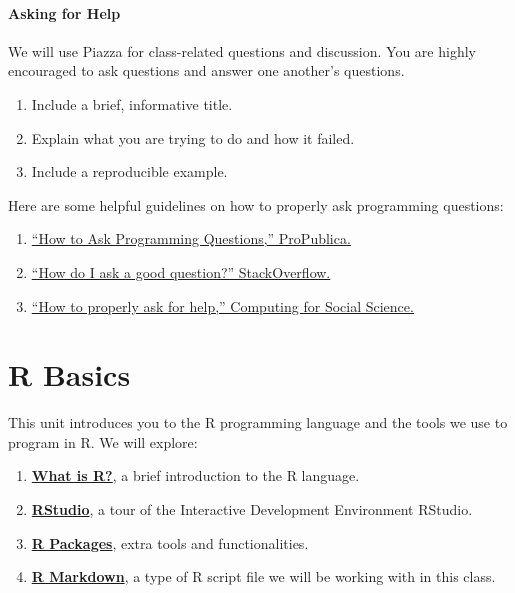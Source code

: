 \documentclass[]{book}
\providecommand{\tightlist}{%
  \setlength{\itemsep}{0pt}\setlength{\parskip}{0pt}}
\begin{document}
\subsubsection*{Asking for Help}\label{asking-for-help}

We will use Piazza for class-related questions and discussion. You are
highly encouraged to ask questions and answer one another's questions.

\begin{enumerate}
\def\labelenumi{\arabic{enumi}.}
\tightlist
\item
  Include a brief, informative title.
\item
  Explain what you are trying to do and how it failed.
\item
  Include a reproducible example.
\end{enumerate}

Here are some helpful guidelines on how to properly ask programming
questions:

\begin{enumerate}
\def\labelenumi{\arabic{enumi}.}
\tightlist
\item
  \href{https://www.propublica.org/nerds/how-to-ask-programming-questions}{``How
  to Ask Programming Questions,'' ProPublica.}
\item
  \href{https://stackoverflow.com/help/how-to-ask}{``How do I ask a good
  question?'' StackOverflow.}
\item
  \href{https://cfss.uchicago.edu/faq/asking-questions/}{``How to
  properly ask for help,'' Computing for Social Science.}
\end{enumerate}

\chapter{R Basics}\label{r-basics}

This unit introduces you to the R programming language and the tools we
use to program in R. We will explore:

\begin{enumerate}
\def\labelenumi{\arabic{enumi}.}
\tightlist
\item
  \textbf{\protect\hyperlink{what-is-r}{What is R?}}, a brief
  introduction to the R language.
\item
  \textbf{\protect\hyperlink{rstudio-1}{RStudio}}, a tour of the
  Interactive Development Environment RStudio.
\item
  \textbf{\protect\hyperlink{r-packages-1}{R Packages}}, extra tools and
  functionalities.
\item
  \textbf{\protect\hyperlink{r-markdown}{R Markdown}}, a type of R
  script file we will be working with in this class.
\end{enumerate}
\end{document}
